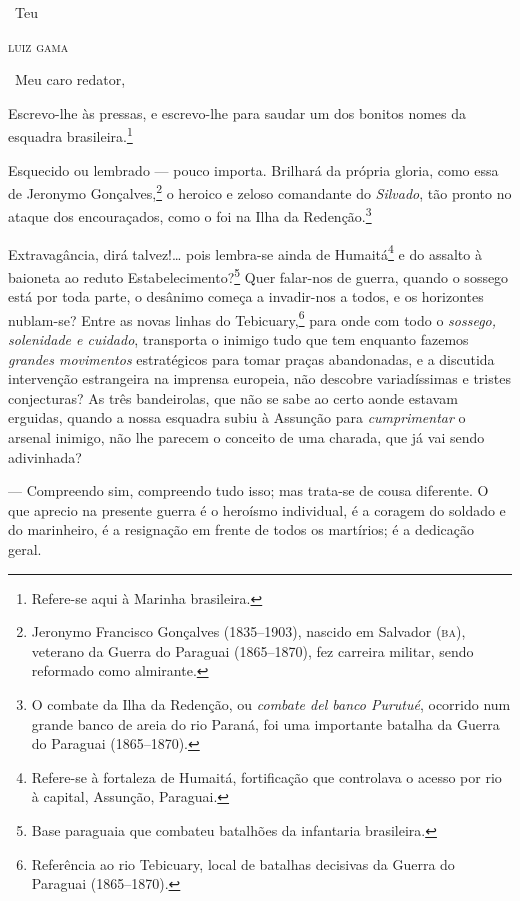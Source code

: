{\hfill\ Teu

\hfill\textsc{luiz gama}

\asterisc

\noindent\ Meu caro redator,

Escrevo-lhe às pressas, e escrevo-lhe para saudar um dos bonitos nomes
da esquadra brasileira.\footnote{Refere-se aqui à Marinha brasileira.}

Esquecido ou lembrado --- pouco importa. Brilhará da própria gloria, como
essa de Jeronymo Gonçalves,\footnote{Jeronymo Francisco Gonçalves
  (1835--1903), nascido em Salvador (\textsc{ba}), veterano da Guerra do Paraguai
  (1865--1870), fez carreira militar, sendo reformado como almirante.} o
heroico e zeloso comandante do \emph{Silvado}, tão pronto no ataque dos
encouraçados, como o foi na Ilha da Redenção.\footnote{O combate da
  Ilha da Redenção, ou \emph{combate del banco Purutué}, ocorrido num
  grande banco de areia do rio Paraná, foi uma importante batalha da
  Guerra do Paraguai (1865--1870).}

Extravagância, dirá talvez!\ldots{} pois lembra-se ainda de Humaitá\footnote{
  Refere-se à fortaleza de Humaitá, fortificação que controlava o acesso
  por rio à capital, Assunção, Paraguai.} e do assalto à baioneta ao
reduto Estabelecimento?\footnote{Base paraguaia que combateu batalhões
  da infantaria brasileira.} Quer falar-nos de guerra, quando o sossego
está por toda parte, o desânimo começa a invadir-nos a todos, e os
horizontes nublam-se? Entre as novas linhas do Tebicuary,\footnote{
  Referência ao rio Tebicuary, local de batalhas decisivas da Guerra do
  Paraguai (1865--1870).} para onde com todo o \emph{sossego, solenidade
e cuidado}, transporta o inimigo tudo que tem enquanto fazemos
\emph{grandes movimentos} estratégicos para tomar praças abandonadas, e
a discutida intervenção estrangeira na imprensa europeia, não descobre
variadíssimas e tristes conjecturas? As três bandeirolas, que não se
sabe ao certo aonde estavam erguidas, quando a nossa esquadra subiu à
Assunção para \emph{cumprimentar} o arsenal inimigo, não lhe parecem o
conceito de uma charada, que já vai sendo adivinhada?

--- Compreendo sim, compreendo tudo isso; mas trata-se de cousa
diferente. O que aprecio na presente guerra é o heroísmo individual, é a
coragem do soldado e do marinheiro, é a resignação em frente de todos os
martírios; é a dedicação geral.

}
